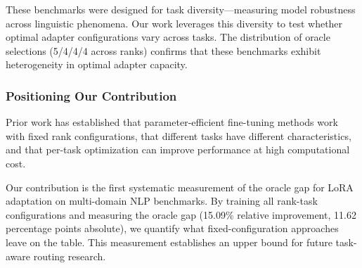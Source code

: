These benchmarks were designed for task diversity—measuring model robustness across linguistic phenomena. Our work leverages this diversity to test whether optimal adapter configurations vary across tasks. The distribution of oracle selections (5/4/4/4 across ranks) confirms that these benchmarks exhibit heterogeneity in optimal adapter capacity.

\subsubsection{Positioning Our Contribution}

Prior work has established that parameter-efficient fine-tuning methods work with fixed rank configurations, that different tasks have different characteristics, and that per-task optimization can improve performance at high computational cost.

Our contribution is the first systematic measurement of the oracle gap for LoRA adaptation on multi-domain NLP benchmarks. By training all rank-task configurations and measuring the oracle gap (15.09\% relative improvement, 11.62 percentage points absolute), we quantify what fixed-configuration approaches leave on the table. This measurement establishes an upper bound for future task-aware routing research.
